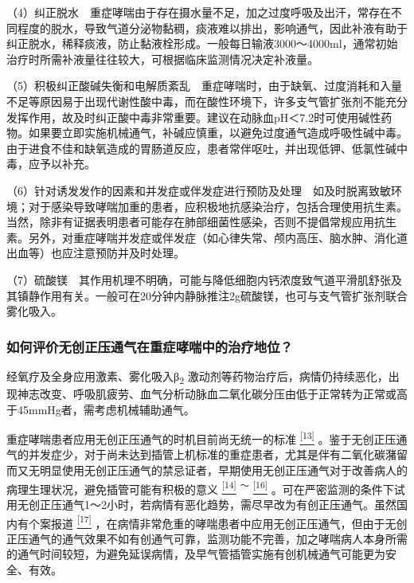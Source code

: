 （4）纠正脱水　重症哮喘由于存在摄水量不足，加之过度呼吸及出汗，常存在不同程度的脱水，导致气道分泌物黏稠，痰液难以排出，影响通气，因此补液有助于纠正脱水，稀释痰液，防止黏液栓形成。一般每日输液3000～4000ml，通常初始治疗时所需补液量往往较大，可根据临床监测情况决定补液量。

（5）积极纠正酸碱失衡和电解质紊乱　重症哮喘时，由于缺氧、过度消耗和入量不足等原因易于出现代谢性酸中毒，而在酸性环境下，许多支气管扩张剂不能充分发挥作用，故及时纠正酸中毒非常重要。建议在动脉血pH＜7.2时可使用碱性药物。如果要立即实施机械通气，补碱应慎重，以避免过度通气造成呼吸性碱中毒。由于进食不佳和缺氧造成的胃肠道反应，患者常伴呕吐，并出现低钾、低氯性碱中毒，应予以补充。

（6）针对诱发发作的因素和并发症或伴发症进行预防及处理　如及时脱离致敏环境；对于感染导致哮喘加重的患者，应积极地抗感染治疗，包括合理使用抗生素。当然，除非有证据表明患者可能存在肺部细菌性感染，否则不提倡常规应用抗生素。另外，对重症哮喘并发症或伴发症（如心律失常、颅内高压、脑水肿、消化道出血等）也应注意预防并及时处理。

（7）硫酸镁　其作用机理不明确，可能与降低细胞内钙浓度致气道平滑肌舒张及其镇静作用有关。一般可在20分钟内静脉推注2g硫酸镁，也可与支气管扩张剂联合雾化吸入。

\subsubsection{如何评价无创正压通气在重症哮喘中的治疗地位？}

经氧疗及全身应用激素、雾化吸入β\textsubscript{2}
激动剂等药物治疗后，病情仍持续恶化，出现神志改变、呼吸肌疲劳、血气分析动脉血二氧化碳分压由低于正常转为正常或高于45mmHg者，需考虑机械辅助通气。

重症哮喘患者应用无创正压通气的时机目前尚无统一的标准
\protect\hyperlink{text00013.htmlux5cux23ch13-12}{\textsuperscript{{[}13{]}}}
。鉴于无创正压通气的并发症少，对于尚未达到插管上机标准的重症患者，尤其是伴有二氧化碳潴留而又无明显使用无创正压通气的禁忌证者，早期使用无创正压通气对于改善病人的病理生理状况，避免插管可能有积极的意义
\protect\hyperlink{text00013.htmlux5cux23ch14-12}{\textsuperscript{{[}14{]}}}
\textsuperscript{～}
\protect\hyperlink{text00013.htmlux5cux23ch16-12}{\textsuperscript{{[}16{]}}}
。可在严密监测的条件下试用无创正压通气1～2小时，若病情有恶化趋势，需尽早改为有创正压通气。虽然国内有个案报道
\protect\hyperlink{text00013.htmlux5cux23ch17-12}{\textsuperscript{{[}17{]}}}
，在病情非常危重的哮喘患者中应用无创正压通气，但由于无创正压通气的通气效果不如有创通气可靠，监测功能不完善，加之哮喘病人本身所需的通气时间较短，为避免延误病情，及早气管插管实施有创机械通气可能更为安全、有效。

